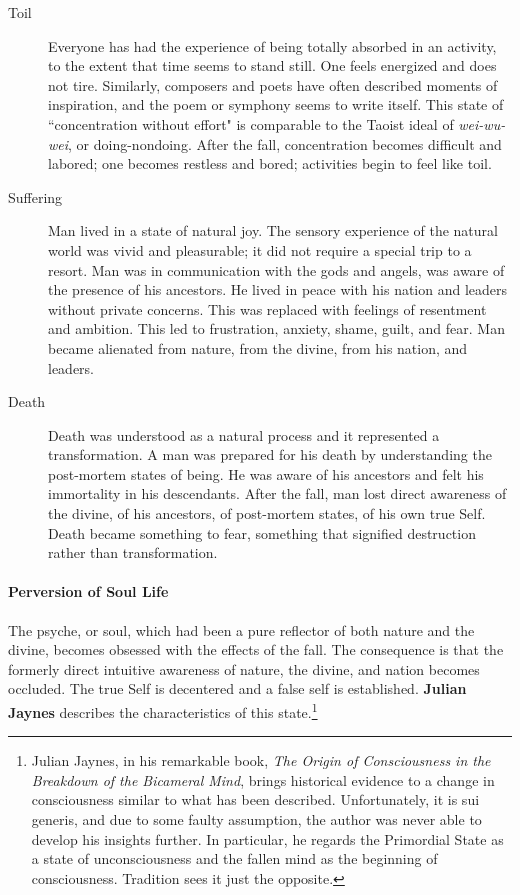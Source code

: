 \begin{description}
\item[Toil ]

Everyone has had the experience of being totally absorbed in an activity, to the extent that time seems to stand still. One feels energized and does not tire. Similarly, composers and poets have often described moments of inspiration, and the poem or symphony seems to write itself. This state of ``concentration without effort" is comparable to the Taoist ideal of \emph{wei-wu-wei}, or doing-nondoing. After the fall, concentration becomes difficult and labored; one becomes restless and bored; activities begin to feel like toil. 

\item[Suffering ]

Man lived in a state of natural joy. The sensory experience of the natural world was vivid and pleasurable; it did not require a special trip to a resort. Man was in communication with the gods and angels, was aware of the presence of his ancestors. He lived in peace with his nation and leaders without private concerns. This was replaced with feelings of resentment and ambition. This led to frustration, anxiety, shame, guilt, and fear. Man became alienated from nature, from the divine, from his nation, and leaders. 

\item[Death ]

Death was understood as a natural process and it represented a transformation. A man was prepared for his death by understanding the post-mortem states of being. He was aware of his ancestors and felt his immortality in his descendants. After the fall, man lost direct awareness of the divine, of his ancestors, of post-mortem states, of his own true Self. Death became something to fear, something that signified destruction rather than transformation. 

\end{description}
\paragraph{Perversion of Soul Life}
The psyche, or soul, which had been a pure reflector of both nature and the divine, becomes obsessed with the effects of the fall. The consequence is that the formerly direct intuitive awareness of nature, the divine, and nation becomes occluded. The true Self is decentered and a false self is established. \textbf{Julian Jaynes} describes the characteristics of this state.\footnote{Julian Jaynes, in his remarkable book, \emph{The Origin of Consciousness in the Breakdown of the Bicameral Mind}, brings historical evidence to a change in consciousness similar to what has been described. Unfortunately, it is sui generis, and due to some faulty assumption, the author was never able to develop his insights further. In particular, he regards the Primordial State as a state of unconsciousness and the fallen mind as the beginning of consciousness. Tradition sees it just the opposite.}


